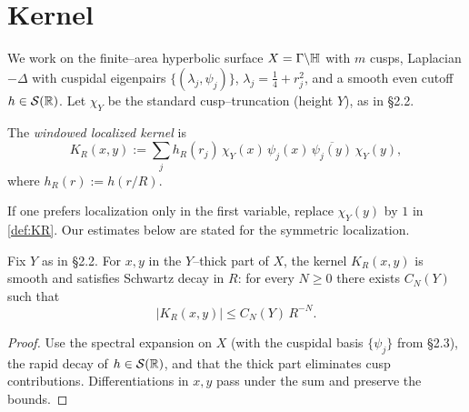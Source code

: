 \section{Kernel}\label{sec:kernel}

We work on the finite–area hyperbolic surface $X=\Gamma\backslash\mathbb{H}$ with $m$ cusps,
Laplacian $-\Delta$ with cuspidal eigenpairs $\{(\lambda_j,\psi_j)\}$, $\lambda_j=\tfrac14+r_j^2$,
and a smooth even cutoff $h\in\mathcal{S}(\mathbb{R})$.
Let $\chi_Y$ be the standard cusp–truncation (height $Y$), as in §2.2.

\begin{definition}\label{def:KR}
The \emph{windowed localized kernel} is
\[
  K_R(x,y)
  := \sum_{j} h_R(r_j)\,\chi_Y(x)\,\psi_j(x)\,\overline{\psi_j(y)}\,\chi_Y(y),
\]
where $h_R(r):=h(r/R)$.
\end{definition}

\begin{remark}
If one prefers localization only in the first variable, replace
$\chi_Y(y)$ by $1$ in \eqref{def:KR}.  Our estimates below are stated
for the symmetric localization.
\end{remark}

\begin{lemma}\label{lem:schwartz-thick}
Fix $Y$ as in §2.2. For $x,y$ in the $Y$–thick part of $X$, the kernel
$K_R(x,y)$ is smooth and satisfies Schwartz decay in $R$:
for every $N\ge 0$ there exists $C_N(Y)$ such that
\[
  \bigl|K_R(x,y)\bigr| \le C_N(Y)\, R^{-N}.
\]
\end{lemma}

\begin{proof}
Use the spectral expansion on $X$ (with the cuspidal basis $\{\psi_j\}$ from §2.3),
the rapid decay of $h\in\mathcal{S}(\mathbb{R})$, and that the thick part eliminates cusp
contributions. Differentiations in $x,y$ pass under the sum and preserve the bounds.
\end{proof}
